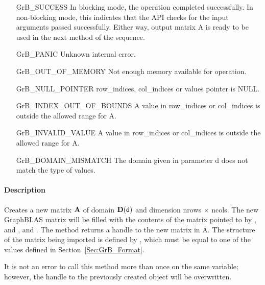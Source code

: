 \begin{itemize}[leftmargin=2.3in]
    \item[{\sf GrB\_SUCCESS}]         In blocking mode, the operation completed
    successfully. In non-blocking mode, this indicates that the API checks 
    for the input arguments passed successfully. Either way, output matrix 
    {\sf A} is ready to be used in the next method of the sequence.

    \item[{\sf GrB\_PANIC}]           Unknown internal error.
    
    \item[{\sf GrB\_OUT\_OF\_MEMORY}] Not enough memory available for operation.
    
    \item[{\sf GrB\_NULL\_POINTER}]  {\sf row\_indices}, 
    {\sf col\_indices} or {\sf values} pointer is {\sf NULL}.

    \item[{\sf GrB\_INDEX\_OUT\_OF\_BOUNDS}] A value in {\sf row\_indices} or
    {\sf col\_indices} is outside the allowed range for {\sf A}.

    \item[{\sf GrB\_INVALID\_VALUE}] A value in {\sf row\_indices} or
    {\sf col\_indices} is outside the allowed range for {\sf A}.

  \item[{\sf GrB\_DOMAIN\_MISMATCH}]  The domain given in parameter {\sf d} does
    not match the type of {\sf values}.
\end{itemize}

\paragraph{Description}

Creates a new matrix ${\bf A}$ of domain $\mathbf{D}({\sf d})$ and dimension
{\sf nrows $\times$ ncols}. The new GraphBLAS matrix will be filled with the
contents of the matrix pointed to by , and , and .
The method returns a handle to the new matrix in {\sf A}.  The structure of
the matrix being imported is defined by , which must be equal to
one of the values defined in Section~\ref{Sec:GrB_Format}.

It is not an error to call this method more than once on the same variable;  
however, the handle to the previously created object will be overwritten. 


